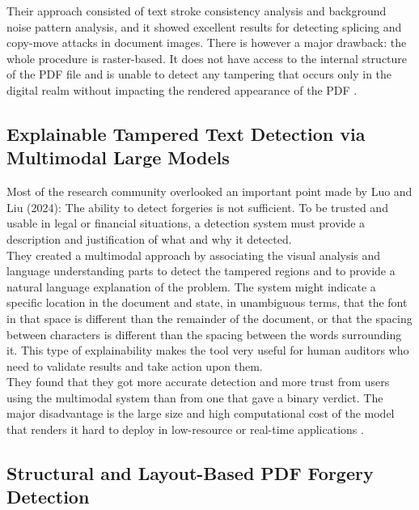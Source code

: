 \noindent Their approach consisted of text stroke consistency analysis and background noise pattern analysis, and it showed excellent results for detecting splicing and copy-move attacks in document images. There is however a major drawback: the whole procedure is raster-based. It does not have access to the internal structure of the PDF file and is unable to detect any tampering that occurs only in the digital realm without impacting the rendered appearance of the PDF \cite{Qu2023TamperedText}.
\\

\subsection{Explainable Tampered Text Detection via Multimodal Large Models}

\noindent Most of the research community overlooked an important point made by Luo and Liu (2024): The ability to detect forgeries is not sufficient. To be trusted and usable in legal or financial situations, a detection system must provide a description and justification of what and why it detected.\\

\noindent They created a multimodal approach by associating the visual analysis and language understanding parts to detect the tampered regions and to provide a natural language explanation of the problem. The system might indicate a specific location in the document and state, in unambiguous terms, that the font in that space is different than the remainder of the document, or that the spacing between characters is different than the spacing between the words surrounding it. This type of explainability makes the tool very useful for human auditors who need to validate results and take action upon them.\\

\noindent They found that they got more accurate detection and more trust from users using the multimodal system than from one that gave a binary verdict. The major disadvantage is the large size and high computational cost of the model that renders it hard to deploy in low-resource or real-time applications \cite{Luo2024Explainable}.\\

\subsection{Structural and Layout-Based PDF Forgery Detection}


